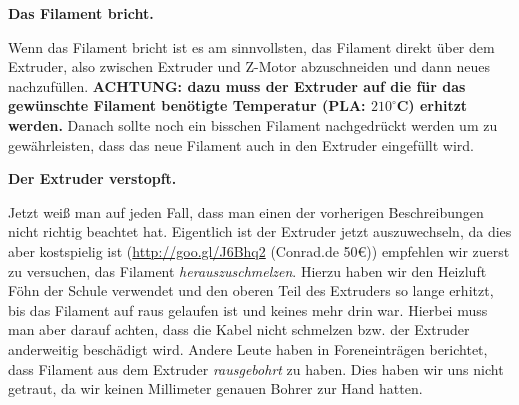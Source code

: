 \documentclass[11pt,a4paper]{scrartcl}
\begin{document}
\begin{description}
\item \textbf{Das Filament bricht.}\\
Wenn das Filament bricht ist es am sinnvollsten, das Filament direkt über dem Extruder, also zwischen Extruder und Z-Motor abzuschneiden und dann neues nachzufüllen. \textbf{ACHTUNG: dazu muss der Extruder auf die für das gewünschte Filament benötigte Temperatur (PLA: $210^\circ$C) erhitzt werden.} Danach sollte noch ein bisschen Filament nachgedrückt werden um zu gewährleisten, dass das neue Filament auch in den Extruder eingefüllt wird.

\item \textbf{Der Extruder verstopft.}\\
Jetzt weiß man auf jeden Fall, dass man einen der vorherigen Beschreibungen nicht richtig beachtet hat. Eigentlich ist der Extruder jetzt auszuwechseln, da dies aber kostspielig ist (\url{http://goo.gl/J6Bhq2} (Conrad.de 50\euro)) empfehlen wir zuerst zu versuchen, das Filament \textit{herauszuschmelzen}. Hierzu haben wir den Heizluft Föhn der Schule verwendet und den oberen Teil des Extruders so lange erhitzt, bis das Filament auf raus gelaufen ist und keines mehr drin war. Hierbei muss man aber darauf achten, dass die Kabel nicht schmelzen bzw. der Extruder anderweitig beschädigt wird. Andere Leute haben in Foreneinträgen berichtet, dass Filament aus dem Extruder \textit{rausgebohrt} zu haben. Dies haben wir uns nicht getraut, da wir keinen Millimeter genauen Bohrer zur Hand hatten.


\end{description}
\end{document}
